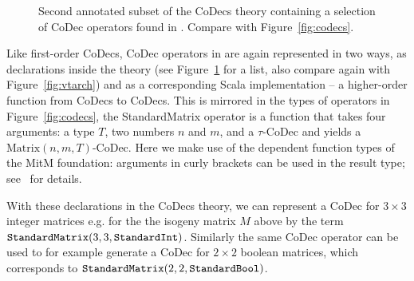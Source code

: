 \begin{figure}[ht]\centering
  \caption[List of Codec Operators]{
    Second annotated subset of the CoDecs theory containing a selection of CoDec operators found in \mmt. 
    Compare with Figure~\ref{fig:codecs}. 
  }
  \label{fig:codecops}
\end{figure}
Like first-order CoDecs, CoDec operators in \mmt are again represented in two ways, as declarations inside the  theory (see Figure~\ref{fig:codecops} for a list, also compare again with Figure~\ref{fig:vtarch}) and as a corresponding Scala implementation -- a higher-order function from CoDecs to CoDecs. 
This is mirrored in the types of operators in Figure~\ref{fig:codecs}, the \textsf{StandardMatrix} operator is a function that takes four arguments: a type $T$, two
numbers $n$ and $m$, and a $\tau$-CoDec and yields a $\mathrm{Matrix}(n, m, T)$-CoDec. 
Here we make use of the dependent function types of the MitM foundation: arguments in curly brackets can be used in the result type; see~\cite{RabKoh:WSMSML13} for details.

With these declarations in the \textsf{CoDecs} theory, we can represent a CoDec for $3 \times 3$ integer matrices e.g. for the the isogeny matrix $M$ above by the \ommt term $\plaintt{StandardMatrix}(3, 3, \plaintt{StandardInt})$.
Similarly the same CoDec operator can be used to for example generate a CoDec for $2 \times 2$ boolean matrices, which corresponds to
$\plaintt{StandardMatrix}(2, 2, \plaintt{StandardBool})$. 

